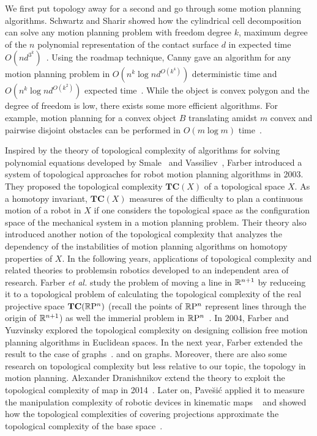We first put topology away for a second and go through some motion planning algorithms. Schwartz and Sharir showed how the cylindrical cell decomposition can solve any motion planning problem with freedom degree \(k\), maximum degree of the \(n\) polynomial representation of the contact surface \(d\) in expected time \(O(nd^{3^k})\)~\cite{schwartz1983piano}. Using the roadmap technique, Canny gave an algorithm for any motion planning problem in \(O(n^k\log{n}d^{O(k^4)})\) deterministic time and \(O(n^k\log{n}d^{O(k^2)})\) expected time~\cite{canny1988complexity}.
While the object is convex polygon and the degree of freedom is low, there exists some more efficient algorithms. For example, motion planning for a convex object \(B\) translating amidst \(m\) convex and pairwise disjoint obstacles can be performed in \(O(m \log{m})\) time~\cite{sharir1997algorithmic}.

Inspired by the theory of topological complexity of algorithms for solving polynomial equations developed by Smale~\cite{smale2000topology} and Vassiliev~\cite{vassiliev1988cohomology}, Farber introduced a system of topological approaches for robot motion planning algorithms in 2003. They proposed the topological complexity \(\mathbf{TC}(X)\) of a topological space \(X\).
As a homotopy invariant, \(\mathbf{TC}(X)\) measures of the difficulty to plan a continuous motion of a robot in \(X\) if one considers the topological space as the configuration space of the mechanical system in a motion planning problem.
Their theory also introduced another notion of the topological complexity that analyzes the dependency of the instabilities of motion planning algorithms on homotopy properties of \(X\).
In the following years, applications of topological complexity and related theories to problemsin robotics developed to an independent area of research.
Farber \emph{et al.} study the problem of moving a line in \(\mathbb{R}^{n+1}\) by reduceing it to a topological problem of calculating the topological complexity of the real projective space \(\mathbf{TC}(\mathbb{R}\mathrm{P}^n)\) (recall the points of \(\mathbb{R}\mathrm{P}^n\) represent lines through the origin of \(\mathbb{R}^{n+1}\)) as well the immerial problem in \(\mathbb{R}\mathrm{P}^n\)~\cite{farber2002topological}.
In 2004, Farber and Yuzvinsky explored the topological complexity on designing collision free motion planning algorithms in Euclidean spaces. In the next year, Farber extended the result to the case of graphs~\cite{farber2004collision}.
and on graphs.
Moreover, there are also some research on topological complexity but less relative to our topic, the topology in motion planning.
Alexander Dranishnikov extend the theory to exploit the topological complexity of map in 2014~\cite{dranishnikov2015topological}. Later on, Pave\u{s}i\'c applied it to measure the manipulation complexity of robotic devices in kinematic maps ~\cite{pavevsic2017complexity,pavesic2018topologist} and showed how the topological complexities of covering projections approximate the topological complexity of the base space~\cite{pavevsic2018topological}.

